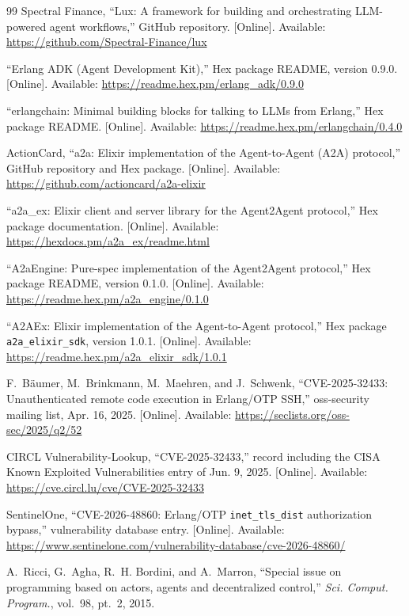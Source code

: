\documentclass[conference,letterpaper]{IEEEtran}
\newcommand{\code}[1]{\texttt{#1}}
\begin{document}
\begin{thebibliography}{99}
Spectral Finance, ``Lux: A framework for building and orchestrating
LLM-powered agent workflows,'' GitHub repository. [Online]. Available:
\url{https://github.com/Spectral-Finance/lux}

``Erlang ADK (Agent Development Kit),'' Hex package README, version 0.9.0.
[Online]. Available: \url{https://readme.hex.pm/erlang_adk/0.9.0}

``erlangchain: Minimal building blocks for talking to LLMs from Erlang,''
Hex package README. [Online]. Available:
\url{https://readme.hex.pm/erlangchain/0.4.0}

ActionCard, ``a2a: Elixir implementation of the Agent-to-Agent (A2A)
protocol,'' GitHub repository and Hex package. [Online]. Available:
\url{https://github.com/actioncard/a2a-elixir}

``a2a\_ex: Elixir client and server library for the Agent2Agent protocol,''
Hex package documentation. [Online]. Available:
\url{https://hexdocs.pm/a2a_ex/readme.html}

``A2aEngine: Pure-spec implementation of the Agent2Agent protocol,'' Hex
package README, version 0.1.0. [Online]. Available:
\url{https://readme.hex.pm/a2a_engine/0.1.0}

``A2AEx: Elixir implementation of the Agent-to-Agent protocol,'' Hex package
\code{a2a\_elixir\_sdk}, version 1.0.1. [Online]. Available:
\url{https://readme.hex.pm/a2a_elixir_sdk/1.0.1}

F.~B\"{a}umer, M.~Brinkmann, M.~Maehren, and J.~Schwenk, ``CVE-2025-32433:
Unauthenticated remote code execution in Erlang/OTP SSH,'' oss-security
mailing list, Apr. 16, 2025. [Online]. Available:
\url{https://seclists.org/oss-sec/2025/q2/52}

CIRCL Vulnerability-Lookup, ``CVE-2025-32433,'' record including the CISA
Known Exploited Vulnerabilities entry of Jun. 9, 2025. [Online]. Available:
\url{https://cve.circl.lu/cve/CVE-2025-32433}

SentinelOne, ``CVE-2026-48860: Erlang/OTP \code{inet\_tls\_dist}
authorization bypass,'' vulnerability database entry. [Online]. Available:
\url{https://www.sentinelone.com/vulnerability-database/cve-2026-48860/}

A.~Ricci, G.~Agha, R.~H. Bordini, and A.~Marron, ``Special issue on
programming based on actors, agents and decentralized control,''
\emph{Sci. Comput. Program.}, vol.~98, pt.~2, 2015.

\end{thebibliography}
\end{document}
